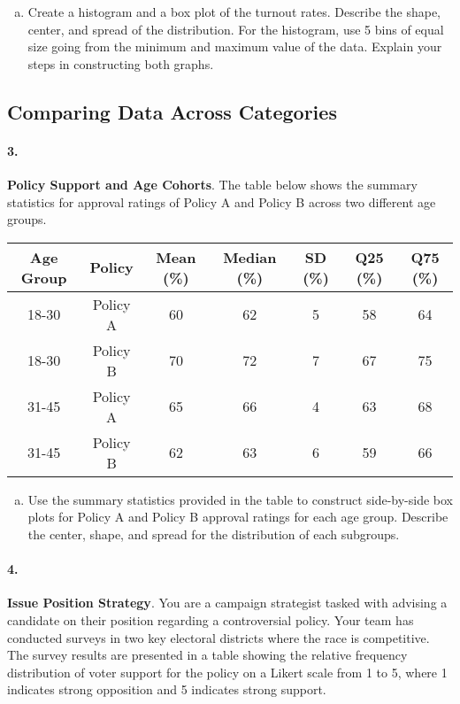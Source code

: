 \documentclass{article}
\begin{document}
\begin{enumerate}[a)]
    \item Create a histogram and a box plot of the turnout rates. Describe the shape, center, and spread of the distribution. For the histogram, use 5 bins of equal size going from the minimum and maximum value of the data. Explain your steps in constructing both graphs.
\end{enumerate}

\subsection*{Comparing Data Across Categories}

\paragraph{3.} \textbf{Policy Support and Age Cohorts}. The table below shows the summary statistics for approval ratings of Policy A and Policy B across two different age groups.

\begin{center}
\begin{tabular}{|c|c|c|c|c|c|c|}
\hline
Age Group & Policy & Mean (\%) & Median (\%) & SD (\%) & Q25 (\%) & Q75 (\%) \\
\hline
18-30 & Policy A & 60 & 62 & 5 & 58 & 64 \\
18-30 & Policy B & 70 & 72 & 7 & 67 & 75 \\
\hline
31-45 & Policy A & 65 & 66 & 4 & 63 & 68 \\
31-45 & Policy B & 62 & 63 & 6 & 59 & 66 \\
\hline
\end{tabular}
\end{center}

\begin{enumerate}[a)]
    \item Use the summary statistics provided in the table to construct side-by-side box plots for Policy A and Policy B approval ratings for each age group. Describe the center, shape, and spread for the distribution of each subgroups.
\end{enumerate}

\paragraph{4.} \textbf{Issue Position Strategy}. You are a campaign strategist tasked with advising a candidate on their position regarding a controversial policy. Your team has conducted surveys in two key electoral districts where the race is competitive. The survey results are presented in a table showing the relative frequency distribution of voter support for the policy on a Likert scale from 1 to 5, where 1 indicates strong opposition and 5 indicates strong support.
\end{document}
